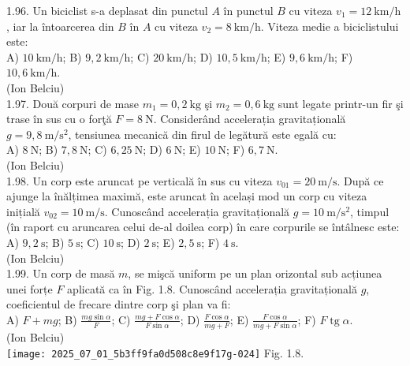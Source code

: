1.96. Un biciclist s-a deplasat din punctul $A$ în punctul $B$ cu viteza $v_{1}=12 \mathrm{~km} / \mathrm{h}$, iar la întoarcerea din $B$ în $A$ cu viteza $v_{2}=8 \mathrm{~km} / \mathrm{h}$. Viteza medie a biciclistului este:\\ A) $10 \mathrm{~km} / \mathrm{h}$; B) $9,2 \mathrm{~km} / \mathrm{h}$; C) $20 \mathrm{~km} / \mathrm{h}$; D) $10,5 \mathrm{~km} / \mathrm{h}$; E) $9,6 \mathrm{~km} / \mathrm{h}$; F) $10,6 \mathrm{~km} / \mathrm{h}$.\\ (Ion Belciu)\\

1.97. Două corpuri de mase $m_{1}=0,2 \mathrm{~kg}$ şi $m_{2}=0,6 \mathrm{~kg}$ sunt legate printr-un fir şi trase în sus cu o forţă $F=8 \mathrm{~N}$. Considerând accelerația gravitațională $g=9,8 \mathrm{~m} / \mathrm{s}^{2}$, tensiunea mecanică din firul de legătură este egală cu:\\ A) $8 \mathrm{~N}$; B) $7,8 \mathrm{~N}$; C) $6,25 \mathrm{~N}$; D) $6 \mathrm{~N}$; E) $10 \mathrm{~N}$; F) $6,7 \mathrm{~N}$.\\ (Ion Belciu)\\

1.98. Un corp este aruncat pe verticală în sus cu viteza $v_{01}=20 \mathrm{~m} / \mathrm{s}$. După ce ajunge la înălțimea maximă, este aruncat în același mod un corp cu viteza inițială $v_{02}=10 \mathrm{~m} / \mathrm{s}$. Cunoscând accelerația gravitațională $g=10 \mathrm{~m} / \mathrm{s}^{2}$, timpul (în raport cu aruncarea celui de-al doilea corp) în care corpurile se întâlnesc este:\\ A) $9,2 \mathrm{~s}$; B) $5 \mathrm{~s}$; C) $10 \mathrm{~s}$; D) $2 \mathrm{~s}$; E) $2,5 \mathrm{~s}$; F) $4 \mathrm{~s}$.\\ (Ion Belciu)\\

1.99. Un corp de masă $m$, se mişcă uniform pe un plan orizontal sub acțiunea unei forțe $F$ aplicată ca în Fig. 1.8. Cunoscând accelerația gravitațională $g$, coeficientul de frecare dintre corp şi plan va fi:\\ A) $F+m g$; B) $\frac{m g \sin \alpha}{F}$; C) $\frac{m g+F \cos \alpha}{F \sin \alpha}$; D) $\frac{F \cos \alpha}{m g+F}$; E) $\frac{F \cos \alpha}{m g+F \sin \alpha}$; F) $F \operatorname{tg} \alpha$.\\ (Ion Belciu)\\ \texttt{[image: 2025\_07\_01\_5b3ff9fa0d508c8e9f17g-024]} Fig. 1.8.\\

